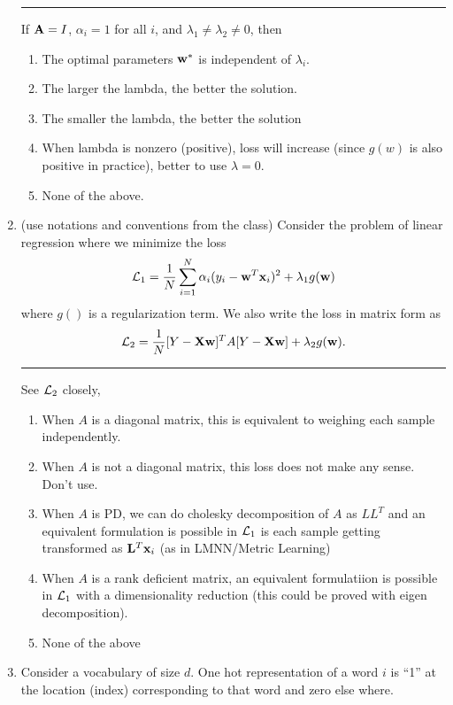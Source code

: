 \documentclass{article}
\begin{document}
\begin{enumerate}
    \hrule

    If ${\bf A} = I$, $\alpha_i = 1$ for all $i$, and $\lambda_1 \neq \lambda_2 \neq 0$, then
    \begin{enumerate}
        \item The optimal parameters ${\bf w}^*$ is independent of $\lambda_i$.
        \item The larger the lambda, the better the solution.
        \item The smaller the lambda, the better the
        solution
        \item When lambda is nonzero (positive), loss will increase (since $g(w)$ is also positive in practice), better to use $\lambda=0$.
        \item None of the above.
    \end{enumerate}

    \item (use notations  and conventions from the class) Consider the problem of linear regression where we
    minimize the loss
    \[{\cal L}_1 = \frac{1}{N}\sum_{i=1}^N \alpha_i (y_i - {\bf w}^T{\bf x}_i)^2 + \lambda_1 g({\bf w})\] where $g()$ is a regularization term. We also write the loss in matrix form as \[ {\cal L}_2 = \frac{1}{N} [Y-{\bf X}{\bf w}]^TA[Y-{\bf X}{\bf w}] + \lambda_2 g({\bf w}). \]

    \hrule
    See ${\cal L}_2$ closely,
    \begin{enumerate}
        \item When $A$ is a diagonal matrix, this is equivalent to weighing each sample independently.
        \item When $A$ is not a  diagonal matrix, this loss does not make any sense. Don't use.
        \item When $A$ is PD, we can do cholesky decomposition of $A$ as $LL^T$ and an equivalent formulation is possible in ${\cal L}_1$ is each sample getting transformed as ${\bf L}^T{\bf x}_i$ (as in LMNN/Metric Learning)
        \item When $A$ is a rank deficient matrix, an equivalent formulatiion is possible in ${\cal L}_1$ with a dimensionality reduction (this could be proved with eigen decomposition).
        \item None of the above
    \end{enumerate}


    \item Consider a vocabulary of size $d$. One hot representation of a word $i$ is ``1'' at the location
    (index) corresponding to that word and zero else where.


\end{enumerate}
\end{document}
